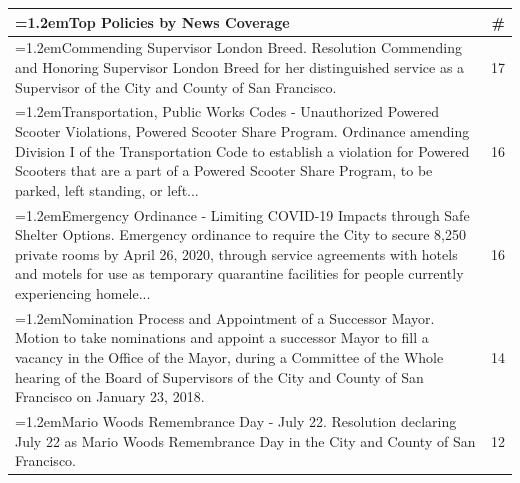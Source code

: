 \documentclass[11pt]{article}
\begin{document}
\begin{table}[t]
    \centering
\begin{tabularx}{\linewidth}{>{\hangindent=1.2em}Xr}
\toprule
 Top Policies by News Coverage & {\#} \\
\midrule
 Commending Supervisor London Breed. Resolution Commending and Honoring Supervisor London Breed for her distinguished service as a Supervisor of the City and County of San Francisco. & 17 \\
Transportation, Public Works Codes - Unauthorized Powered Scooter Violations, Powered Scooter Share Program. Ordinance amending Division I of the Transportation Code to establish a violation for Powered Scooters that are a part of a Powered Scooter Share Program, to be parked, left standing, or left... & 16 \\
Emergency Ordinance - Limiting COVID-19 Impacts through Safe Shelter Options. Emergency ordinance to require the City to secure 8,250 private rooms by April 26, 2020, through service agreements with hotels and motels for use as temporary quarantine facilities for people currently experiencing homele... & 16 \\
Nomination Process and Appointment of a Successor Mayor. Motion to take nominations and appoint a successor Mayor to fill a vacancy in the Office of the Mayor, during a Committee of the Whole hearing of the Board of Supervisors of the City and County of San Francisco on January 23, 2018. & 14 \\
 Mario Woods Remembrance Day - July 22. Resolution declaring July 22 as Mario Woods Remembrance Day in the City and County of San Francisco. & 12 \\

\end{tabularx}
\end{table}
\end{document}
